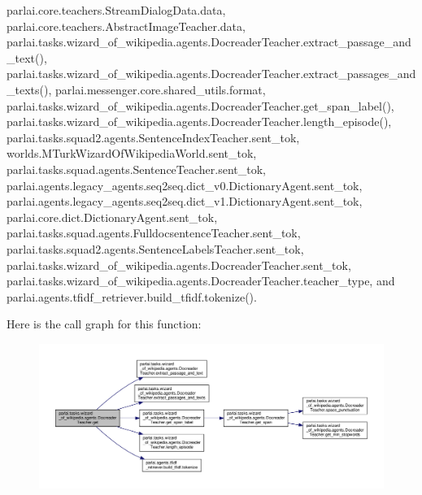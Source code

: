 parlai.\+core.\+teachers.\+Stream\+Dialog\+Data.\+data, parlai.\+core.\+teachers.\+Abstract\+Image\+Teacher.\+data, parlai.\+tasks.\+wizard\+\_\+of\+\_\+wikipedia.\+agents.\+Docreader\+Teacher.\+extract\+\_\+passage\+\_\+and\+\_\+text(), parlai.\+tasks.\+wizard\+\_\+of\+\_\+wikipedia.\+agents.\+Docreader\+Teacher.\+extract\+\_\+passages\+\_\+and\+\_\+texts(), parlai.\+messenger.\+core.\+shared\+\_\+utils.\+format, parlai.\+tasks.\+wizard\+\_\+of\+\_\+wikipedia.\+agents.\+Docreader\+Teacher.\+get\+\_\+span\+\_\+label(), parlai.\+tasks.\+wizard\+\_\+of\+\_\+wikipedia.\+agents.\+Docreader\+Teacher.\+length\+\_\+episode(), parlai.\+tasks.\+squad2.\+agents.\+Sentence\+Index\+Teacher.\+sent\+\_\+tok, worlds.\+M\+Turk\+Wizard\+Of\+Wikipedia\+World.\+sent\+\_\+tok, parlai.\+tasks.\+squad.\+agents.\+Sentence\+Teacher.\+sent\+\_\+tok, parlai.\+agents.\+legacy\+\_\+agents.\+seq2seq.\+dict\+\_\+v0.\+Dictionary\+Agent.\+sent\+\_\+tok, parlai.\+agents.\+legacy\+\_\+agents.\+seq2seq.\+dict\+\_\+v1.\+Dictionary\+Agent.\+sent\+\_\+tok, parlai.\+core.\+dict.\+Dictionary\+Agent.\+sent\+\_\+tok, parlai.\+tasks.\+squad.\+agents.\+Fulldocsentence\+Teacher.\+sent\+\_\+tok, parlai.\+tasks.\+squad2.\+agents.\+Sentence\+Labels\+Teacher.\+sent\+\_\+tok, parlai.\+tasks.\+wizard\+\_\+of\+\_\+wikipedia.\+agents.\+Docreader\+Teacher.\+sent\+\_\+tok, parlai.\+tasks.\+wizard\+\_\+of\+\_\+wikipedia.\+agents.\+Docreader\+Teacher.\+teacher\+\_\+type, and parlai.\+agents.\+tfidf\+\_\+retriever.\+build\+\_\+tfidf.\+tokenize().

Here is the call graph for this function\+:
\nopagebreak
\begin{figure}[H]
\begin{center}
\leavevmode
\includegraphics[width=350pt]{classparlai_1_1tasks_1_1wizard__of__wikipedia_1_1agents_1_1DocreaderTeacher_a759c5a19439387e69d272bb719c568c3_cgraph}
\end{center}
\end{figure}
\mbox{\label{classparlai_1_1tasks_1_1wizard__of__wikipedia_1_1agents_1_1DocreaderTeacher_a5dba8f178a059e0daae7fec42bfc4330}} 
